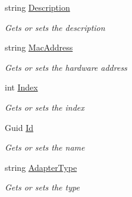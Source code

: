 \begin{DoxyCompactItemize}
\item 
string \hyperlink{class_microsoft_1_1_tools_1_1_windows_device_portal_1_1_device_portal_1_1_network_adapter_info_ab2697adebb9cfb1369058d5fa6b0d63c}{Description}
\begin{DoxyCompactList}\small\item\em Gets or sets the description \end{DoxyCompactList}\item 
string \hyperlink{class_microsoft_1_1_tools_1_1_windows_device_portal_1_1_device_portal_1_1_network_adapter_info_a9f5a3d0a2af048fe9ff9667e9bbb2d37}{Mac\+Address}
\begin{DoxyCompactList}\small\item\em Gets or sets the hardware address \end{DoxyCompactList}\item 
int \hyperlink{class_microsoft_1_1_tools_1_1_windows_device_portal_1_1_device_portal_1_1_network_adapter_info_a5ab6ea11e6fd16cf996394a077579a51}{Index}
\begin{DoxyCompactList}\small\item\em Gets or sets the index \end{DoxyCompactList}\item 
Guid \hyperlink{class_microsoft_1_1_tools_1_1_windows_device_portal_1_1_device_portal_1_1_network_adapter_info_a564e5a45ebf001b1144219e715857025}{Id}
\begin{DoxyCompactList}\small\item\em Gets or sets the name \end{DoxyCompactList}\item 
string \hyperlink{class_microsoft_1_1_tools_1_1_windows_device_portal_1_1_device_portal_1_1_network_adapter_info_accde41e0b52f24ab0392fec5f3a9222d}{Adapter\+Type}
\begin{DoxyCompactList}\small\item\em Gets or sets the type \end{DoxyCompactList}\item 

\end{DoxyCompactItemize}
